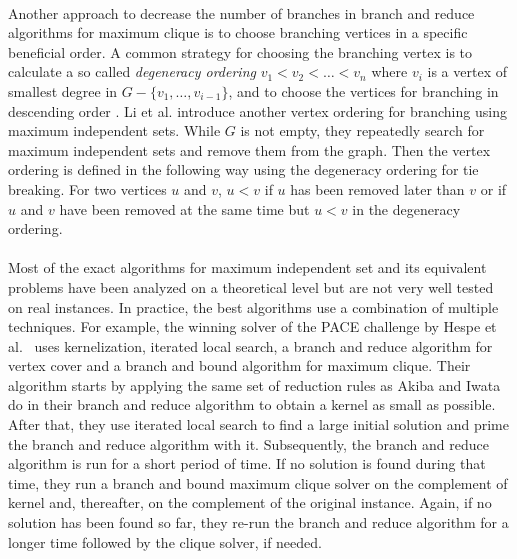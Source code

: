 \documentclass[12pt,a4paper,twoside]{scrartcl}
\numberwithin{equation}{section}
\begin{document}
\paragraph{}
Another approach to decrease the number of branches in branch and reduce algorithms for maximum clique is to choose branching vertices in a specific beneficial order. A common strategy for choosing the branching vertex is to calculate a so called \textit{degeneracy ordering} $v_1 < v_2 < \dots < v_n$ where $v_i$ is a vertex of smallest degree in $G - \{v_1, \dots, v_{i-1} \}$, and to choose the vertices for branching in descending order \cite{CarraghanPardalos}. Li et al. \cite{LiFangXu} introduce another vertex ordering for branching using maximum independent sets. While $G$ is not empty, they repeatedly search for maximum independent sets and remove them from the graph. Then the vertex ordering is defined in the following way using the degeneracy ordering for tie breaking. For two vertices $u$ and $v$, $u < v$ if $u$ has been removed later than $v$ or if $u$ and $v$ have been removed at the same time but $u < v$ in the degeneracy ordering. 

\paragraph{}
Most of the exact algorithms for maximum independent set and its equivalent problems have been analyzed on a theoretical level but are not very well tested on real instances. In practice, the best algorithms use a combination of multiple techniques. For example, the winning solver of the PACE challenge by Hespe et al.~\cite{WGYC} uses kernelization, iterated local search, a branch and reduce algorithm for vertex cover and a branch and bound algorithm for maximum clique. Their algorithm starts by applying the same set of reduction rules as Akiba and Iwata \cite{AkibaIwata} do in their branch and reduce algorithm to obtain a kernel as small as possible. After that, they use iterated local search to find a large initial solution and prime the branch and reduce algorithm with it. Subsequently, the branch and reduce algorithm is run for a short period of time. If no solution is found during that time, they run a branch and bound maximum clique solver on the complement of kernel and, thereafter, on the complement of the original instance. Again, if no solution has been found so far, they re-run the branch and reduce algorithm for a longer time followed by the clique solver, if needed.

\clearpage
\end{document}

